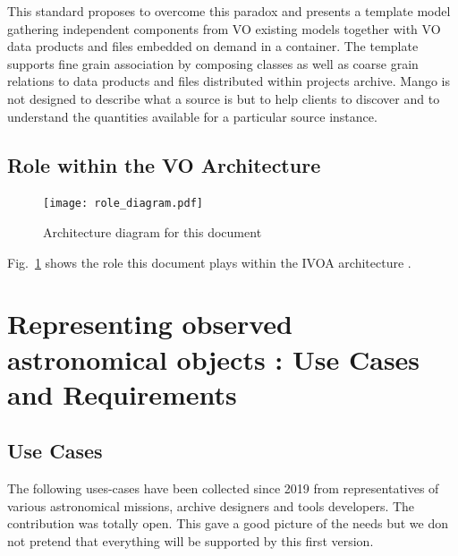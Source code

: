 \documentclass[11pt,a4paper]{ivoa}
\newcommand{\TODO}[1]{%
    \noindent%
    \colorbox{todocolor}{%
            \parbox{0.85\linewidth}{\sffamily \textbf{TODO:}\\
            #1}
    }%
    \vspace{2pt}

}
\begin{document}
This standard proposes to overcome this paradox and presents a template model gathering independent components from VO existing models 
together with VO data products and files embedded on demand in a container.
The template supports fine grain association by composing classes as well as coarse grain relations to data products and files distributed within projects archive.
Mango is not designed to describe what a source is but to help clients to discover and to understand the quantities available for a particular source instance.

\subsection{Role within the VO Architecture}

\begin{figure}
\centering


\texttt{[image: role\_diagram.pdf]}
\caption{Architecture diagram for this document}
\label{fig:archdiag}
\end{figure}

Fig.~\ref{fig:archdiag} shows the role this document plays within the
IVOA architecture \citep{note:VOARCH}.



\section{Representing observed astronomical objects : Use Cases and  Requirements}

\subsection{Use Cases}
The following uses-cases have been collected since 2019 from representatives of various astronomical missions, archive designers and tools developers.
The contribution was totally open. This gave a good picture of the needs but we don not pretend that everything will be supported by this first version.

\end{document}
